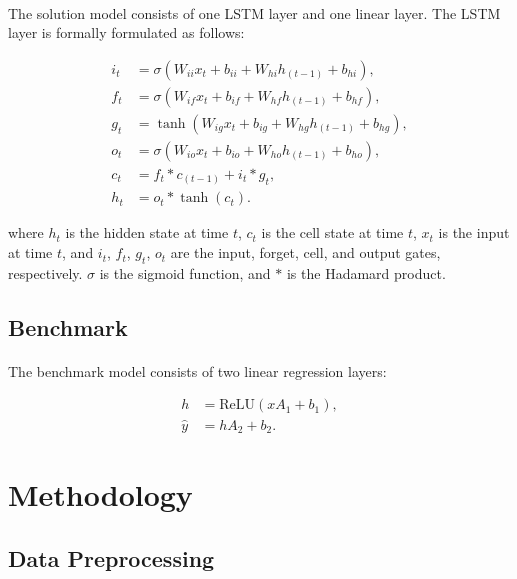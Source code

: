 \documentclass[12pt, letterpaper]{article}
\begin{document}
\paragraph{}
The solution model consists of one LSTM layer and one linear layer. The LSTM layer is formally formulated as follows:

\begin{align*}
    i_t & =\sigma\left(W_{ii}x_t+b_{ii}+W_{hi}h_{(t-1)}+b_{hi}\right), \\
    f_t & =\sigma\left(W_{if}x_t+b_{if}+W_{hf}h_{(t-1)}+b_{hf}\right), \\
    g_t & =\tanh\left(W_{ig}x_t+b_{ig}+W_{hg}h_{(t-1)}+b_{hg}\right), \\
    o_t & =\sigma\left(W_{io}x_t+b_{io}+W_{ho}h_{(t-1)}+b_{ho}\right), \\
    c_t & =f_t*c_{(t-1)}+i_t*g_t, \\
    h_t & =o_t*\tanh(c_t).
\end{align*}

where \(h_t\) is the hidden state at time \(t\), \(c_t\) is the cell state at time \(t\), \(x_t\) is the input at time \(t\), and \(i_t\), \(f_t\), \(g_t\), \(o_t\) are the input, forget, cell, and output gates, respectively. \(\sigma \) is the sigmoid function, and \(*\) is the Hadamard product.

\subsection{Benchmark}

\paragraph{}
The benchmark model consists of two linear regression layers:

\begin{align*}
    h&=\mathrm{ReLU}\left(xA_1+b_1\right), \\
    \hat y&=hA_2+b_2.
\end{align*}

\section{Methodology} %

\subsection{Data Preprocessing}
\end{document}
